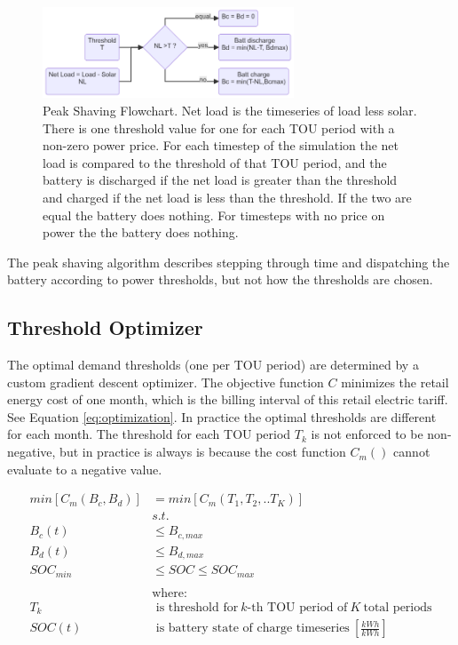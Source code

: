 \documentclass[journal,article,submit,pdftex,moreauthors]{Definitions/mdpi}
\begin{document}
\begin{figure}
  \centering
  \includegraphics[width=7.5cm]{./images/peak shaving flowchart.png}
  \caption{Peak Shaving Flowchart. Net load is the
  timeseries of load less solar. There is one threshold value for one for
  each TOU period with a non-zero power price. For each timestep of the
  simulation the net load is compared to the threshold of that TOU period,
  and the battery is discharged if the net load is greater than the
  threshold and charged if the net load is less than the threshold. If the
  two are equal the battery does nothing. For timesteps with no price on
  power the the battery does nothing.}
  \label{fig:peakshaving-flowchart}
\end{figure}

The peak shaving algorithm describes stepping through time and
dispatching the battery according to power thresholds, but not how the
thresholds are chosen.

\subsection{Threshold Optimizer}\label{threshold-optimizer}%

The optimal demand thresholds (one per TOU period) are determined by a
custom gradient descent optimizer. The objective function \(C\)
minimizes the retail energy cost of one month, which is the billing
interval of this retail electric tariff. See Equation \ref{eq:optimization}. In practice the optimal
thresholds are different for each month. The threshold for each TOU
period \(T_k\) is not enforced to be non-negative, but in practice is
always is because the cost function \(C_m()\) cannot evaluate to a
negative value.

\begin{equation}
  \label{eq:optimization}
  \begin{split}
    min[C_m(B_c,B_d)] & = min[C_m(T_1,T_2,..T_K)] \\
    & s.t. \\
    B_c(t) & \le B_{c,max} \\
    B_d(t) & \le B_{d,max} \\
    SOC_{min} & \le SOC \le SOC_{max} \\
    \\
    & \text{where:} \\
    T_k & \text{ is threshold for}\ k\text{-th TOU period of}\ K\ \text{total periods} \\
    SOC(t) & \text{ is battery state of charge timeseries}\ [\frac{kWh}{kWh}] \\
  \end{split}
\end{equation}
\end{document}
